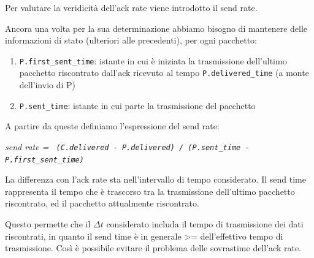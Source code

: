 Per valutare la veridicità dell'ack rate viene introdotto il send rate. \bigskip

Ancora una volta per la sua determinazione abbiamo bisogno di mantenere delle informazioni di stato (ulteriori alle precedenti), per ogni pacchetto:

\begin{enumerate}

\item \texttt{P.first\_sent\_time}: istante in cui è iniziata la trasmissione dell’ultimo pacchetto riscontrato dall’ack ricevuto al tempo \texttt{P.delivered\_time} (a monte dell’invio di P) 
\item \texttt{P.sent\_time}: istante in cui parte la trasmissione del pacchetto

\end{enumerate}

A partire da queste definiamo l'espressione del send rate:

\begin{center}
 
\textit{send rate = \texttt{ (C.delivered - P.delivered) / (P.sent\_time - P.first\_sent\_time)}}

\end{center}

La differenza con l'ack rate sta nell'intervallo di tempo considerato. Il send time rappresenta il tempo che è trascorso tra la trasmissione dell'ultimo pacchetto riscontrato, ed il pacchetto attualmente riscontrato. \bigskip

Questo permette che il $\Delta t$ considerato includa il tempo di trasmissione dei dati riscontrati, in quanto il send time è in generale >= dell'effettivo tempo di trasmissione. Così è possibile evitare il problema delle sovrastime dell'ack rate. \bigskip

